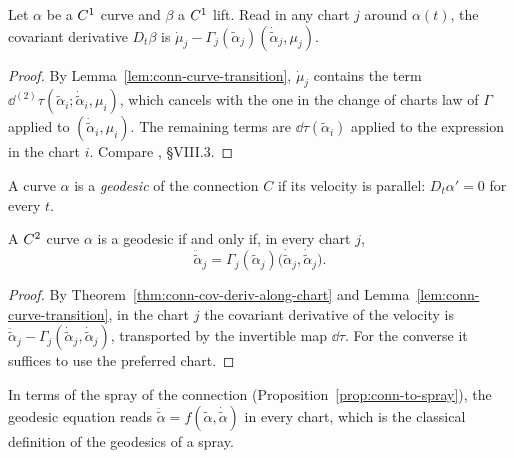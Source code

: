 \begin{theorem}
  \label{thm:conn-cov-deriv-along-chart}
  \leanok
  Let $\alpha$ be a $C^{1}$ curve and $\beta$ a $C^{1}$ lift. Read in any chart $j$ around
  $\alpha(t)$, the covariant derivative $D_t\beta$ is
  $\dot\mu_j - \Gamma_j(\tilde\alpha_j)(\dot{\tilde\alpha}_j, \mu_j)$.
\end{theorem}

\begin{proof}
  \leanok
  By Lemma~\ref{lem:conn-curve-transition}, $\dot\mu_j$ contains the term
  $\dd^{(2)}\tau(\tilde\alpha_i; \dot{\tilde\alpha}_i, \mu_i)$, which cancels with the one in the
  change of charts law of $\Gamma$ applied to $(\dot{\tilde\alpha}_i, \mu_i)$. The remaining
  terms are $\dd\tau(\tilde\alpha_i)$ applied to the expression in the chart $i$. Compare
  \cite{Lan99}, \S VIII.3.
\end{proof}

\begin{definition}[Geodesic]
  \label{def:geodesic}
  \leanok
  A curve $\alpha$ is a \emph{geodesic} of the connection $C$ if its velocity is parallel:
  $D_t \alpha' = 0$ for every $t$.
\end{definition}

\begin{theorem}
  \label{thm:conn-geodesic-equation}
  \leanok
  A $C^{2}$ curve $\alpha$ is a geodesic if and only if, in every chart $j$,
  \[
    \ddot{\tilde\alpha}_j = \Gamma_j(\tilde\alpha_j)\bigl(\dot{\tilde\alpha}_j, \dot{\tilde\alpha}_j\bigr).
  \]
\end{theorem}

\begin{proof}
  \leanok
  By Theorem~\ref{thm:conn-cov-deriv-along-chart} and Lemma~\ref{lem:conn-curve-transition}, in
  the chart $j$ the covariant derivative of the velocity is
  $\ddot{\tilde\alpha}_j - \Gamma_j(\dot{\tilde\alpha}_j, \dot{\tilde\alpha}_j)$, transported by
  the invertible map $\dd\tau$. For the converse it suffices to use the preferred chart.
\end{proof}

In terms of the spray of the connection (Proposition~\ref{prop:conn-to-spray}), the geodesic
equation reads $\ddot{\tilde\alpha} = f(\tilde\alpha, \dot{\tilde\alpha})$ in every chart, which is
the classical definition of the geodesics of a spray.

